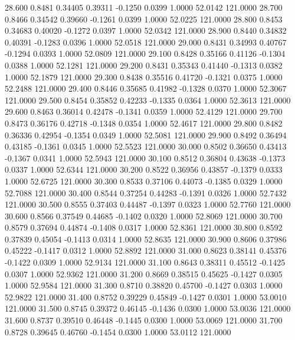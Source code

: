   28.600   0.8481   0.34405   0.39311  -0.1250   0.0399   1.0000  52.0142 121.0000
  28.700   0.8466   0.34542   0.39660  -0.1261   0.0399   1.0000  52.0225 121.0000
  28.800   0.8453   0.34683   0.40020  -0.1272   0.0397   1.0000  52.0342 121.0000
  28.900   0.8440   0.34832   0.40391  -0.1283   0.0396   1.0000  52.0518 121.0000
  29.000   0.8431   0.34993   0.40767  -0.1294   0.0393   1.0000  52.0809 121.0000
  29.100   0.8428   0.35166   0.41126  -0.1304   0.0388   1.0000  52.1281 121.0000
  29.200   0.8431   0.35343   0.41440  -0.1313   0.0382   1.0000  52.1879 121.0000
  29.300   0.8438   0.35516   0.41720  -0.1321   0.0375   1.0000  52.2488 121.0000
  29.400   0.8446   0.35685   0.41982  -0.1328   0.0370   1.0000  52.3067 121.0000
  29.500   0.8454   0.35852   0.42233  -0.1335   0.0364   1.0000  52.3613 121.0000
  29.600   0.8463   0.36014   0.42478  -0.1341   0.0359   1.0000  52.4129 121.0000
  29.700   0.8473   0.36176   0.42718  -0.1348   0.0354   1.0000  52.4617 121.0000
  29.800   0.8482   0.36336   0.42954  -0.1354   0.0349   1.0000  52.5081 121.0000
  29.900   0.8492   0.36494   0.43185  -0.1361   0.0345   1.0000  52.5523 121.0000
  30.000   0.8502   0.36650   0.43413  -0.1367   0.0341   1.0000  52.5943 121.0000
  30.100   0.8512   0.36804   0.43638  -0.1373   0.0337   1.0000  52.6344 121.0000
  30.200   0.8522   0.36956   0.43857  -0.1379   0.0333   1.0000  52.6725 121.0000
  30.300   0.8533   0.37106   0.44073  -0.1385   0.0329   1.0000  52.7088 121.0000
  30.400   0.8544   0.37254   0.44283  -0.1391   0.0326   1.0000  52.7432 121.0000
  30.500   0.8555   0.37403   0.44487  -0.1397   0.0323   1.0000  52.7760 121.0000
  30.600   0.8566   0.37549   0.44685  -0.1402   0.0320   1.0000  52.8069 121.0000
  30.700   0.8579   0.37694   0.44874  -0.1408   0.0317   1.0000  52.8361 121.0000
  30.800   0.8592   0.37839   0.45054  -0.1413   0.0314   1.0000  52.8635 121.0000
  30.900   0.8606   0.37986   0.45222  -0.1417   0.0312   1.0000  52.8892 121.0000
  31.000   0.8623   0.38141   0.45376  -0.1422   0.0309   1.0000  52.9134 121.0000
  31.100   0.8643   0.38311   0.45512  -0.1425   0.0307   1.0000  52.9362 121.0000
  31.200   0.8669   0.38515   0.45625  -0.1427   0.0305   1.0000  52.9584 121.0000
  31.300   0.8710   0.38820   0.45700  -0.1427   0.0303   1.0000  52.9822 121.0000
  31.400   0.8752   0.39229   0.45849  -0.1427   0.0301   1.0000  53.0010 121.0000
  31.500   0.8745   0.39372   0.46145  -0.1436   0.0300   1.0000  53.0036 121.0000
  31.600   0.8737   0.39510   0.46448  -0.1445   0.0300   1.0000  53.0069 121.0000
  31.700   0.8728   0.39645   0.46760  -0.1454   0.0300   1.0000  53.0112 121.0000
